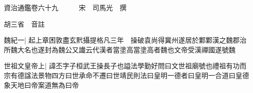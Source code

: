 






























































資治通鑑卷六十九　　　宋　司馬光　撰

胡三省　音註

魏紀一|{
	起上章困敦盡玄黓攝提格凡三年　操破袁尚得冀州遂居於鄴鄴漢之魏郡治所魏大名也遂封為魏公又䜟云代漢者當塗高當塗高者魏也文帝受漢禪國遂號魏}


世祖文皇帝上|{
	諱丕字子桓武王操長子也謚法學勤好問曰文世祖廟號也禮祖有功而宗有德諡法景物四方曰世承命不遷曰世靖民則法曰皇明一德者曰皇明一合道曰皇德象天地曰帝案道無為曰帝}


